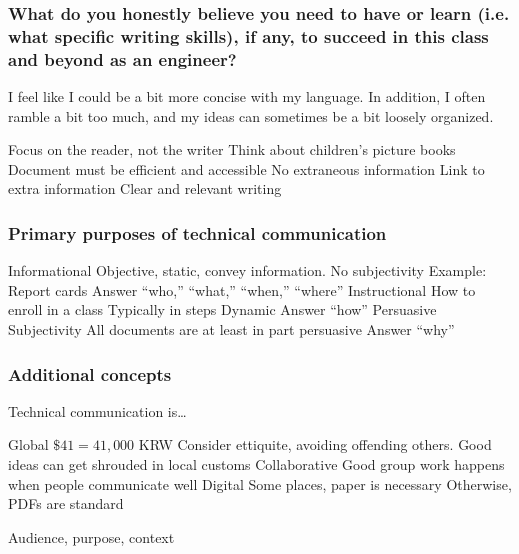 \subsubsection{What do you honestly believe you need to have or learn (i.e. what specific writing skills), if any, to succeed in this class and beyond as an engineer?}

I feel like I could be a bit more concise with my language. In addition, I often ramble a bit too much, and my ideas can sometimes be a bit loosely organized.

\begin{outline}
    \1 Focus on the reader, not the writer 
        \2 Think about children's picture books
    \1 Document must be efficient and accessible
        \2 No extraneous information
        \2 Link to extra information
    \1 Clear and relevant writing
\end{outline}

\subsubsection{Primary purposes of technical communication}

\begin{outline}
    \1 Informational
        \2 Objective, static, convey information. 
        \2 No subjectivity
        \2 Example: Report cards
        \2 Answer ``who,'' ``what,'' ``when,'' ``where''
    \1 Instructional    
        \2 How to enroll in a class 
        \2 Typically in steps
        \2 Dynamic
        \2 Answer ``how''
    \1 Persuasive
        \2 Subjectivity
        \2 All documents are at least in part persuasive
        \2 Answer ``why''
\end{outline}

\subsubsection{Additional concepts}

Technical communication is\dots

\begin{outline}
    \1 Global
        \2 $\$41 = 41,000$ KRW
        \2 Consider ettiquite, avoiding offending others. Good ideas can get shrouded in local customs
    \1 Collaborative
        \2 Good group work happens when people communicate well
    \1 Digital
        \2 Some places, paper is necessary
        \2 Otherwise, PDFs are standard
\end{outline}

Audience, purpose, context
